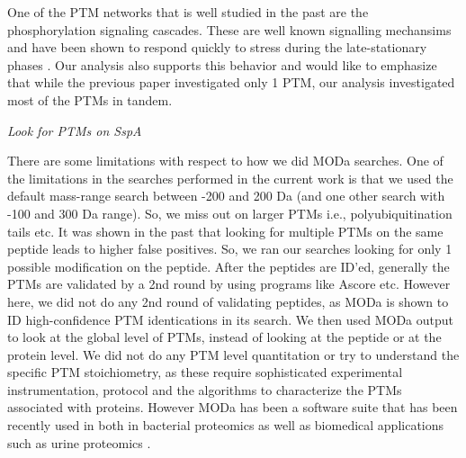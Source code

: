 \documentclass[12pt]{article}
\begin{document}
One of the PTM networks that is well studied in the past are the phosphorylation signaling cascades\cite{Olsenetal2006}. These are well known signalling mechansims and have been shown to respond quickly to stress during the late-stationary phases \cite{Soaresetal2013}. Our analysis also supports this behavior and would like to emphasize that while the previous paper investigated only 1 PTM, our analysis investigated most of the PTMs in tandem. 






\emph{Look for PTMs on SspA}

There are some limitations with respect to how we did MODa searches. One of the limitations in the searches performed in the current work is that we used the default mass-range search between -200 and 200 Da (and one other search with -100 and 300 Da range). So, we miss out on larger PTMs i.e., polyubiquitination tails etc. It was shown in the past that looking for multiple PTMs on the same peptide leads to higher false positives. So, we ran our searches looking for only 1 possible modification on the peptide. After the peptides are ID'ed, generally the PTMs are validated by a 2nd round by using programs like Ascore etc. However here, we did not do any 2nd round of validating peptides, as MODa is shown to ID high-confidence PTM identications in its search. We then used MODa output to look at the global level of PTMs, instead of looking at the peptide or at the protein level. We did not do any PTM level quantitation or try to understand the specific PTM stoichiometry, as these require sophisticated experimental instrumentation, protocol and the algorithms to characterize the PTMs associated with proteins. However MODa has been a software suite that has been recently used in both in bacterial proteomics as well as biomedical applications such as urine proteomics \cite{Liuetal2013}.
\end{document}
